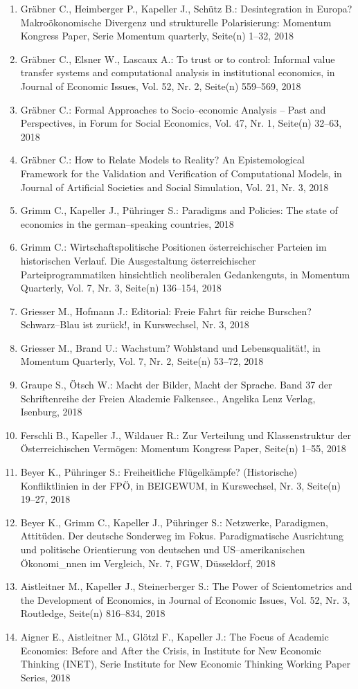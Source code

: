 \begin{enumerate}
	 \item Gräbner C., Heimberger P., Kapeller J., Schütz B.: Desintegration in Europa? Makroökonomische Divergenz und strukturelle Polarisierung: Momentum Kongress Paper, Serie Momentum quarterly, Seite(n) 1--32, 2018
	 \item Gräbner C., Elsner W., Lascaux A.: To trust or to control: Informal value transfer systems and computational analysis in institutional economics, in Journal of Economic Issues, Vol. 52, Nr. 2, Seite(n) 559--569, 2018
	 \item Gräbner C.: Formal Approaches to Socio--economic Analysis -- Past and Perspectives, in Forum for Social Economics, Vol. 47, Nr. 1, Seite(n) 32--63, 2018
	 \item Gräbner C.: How to Relate Models to Reality? An Epistemological Framework for the Validation and Verification of Computational Models, in Journal of Artificial Societies and Social Simulation, Vol. 21, Nr. 3, 2018
	 \item Grimm C., Kapeller J., Pühringer S.: Paradigms and Policies: The state of economics in the german--speaking countries, 2018
	 \item Grimm C.: Wirtschaftspolitische Positionen österreichischer Parteien im historischen Verlauf. Die Ausgestaltung österreichischer Parteiprogrammatiken hinsichtlich neoliberalen Gedankenguts, in Momentum Quarterly, Vol. 7, Nr. 3, Seite(n) 136--154, 2018
	 \item Griesser M., Hofmann J.: Editorial: Freie Fahrt für reiche Burschen? Schwarz--Blau ist zurück!, in Kurswechsel, Nr. 3, 2018
	 \item Griesser M., Brand U.: Wachstum? Wohlstand und Lebensqualität!, in Momentum Quarterly, Vol. 7, Nr. 2, Seite(n) 53--72, 2018
	 \item Graupe S., Ötsch W.: Macht der Bilder, Macht der Sprache. Band 37 der Schriftenreihe der Freien Akademie Falkensee., Angelika Lenz Verlag, Isenburg, 2018
	 \item Ferschli B., Kapeller J., Wildauer R.: Zur Verteilung und Klassenstruktur der Österreichischen Vermögen: Momentum Kongress Paper, Seite(n) 1--55, 2018
	 \item Beyer K., Pühringer S.: Freiheitliche Flügelkämpfe? (Historische) Konfliktlinien in der FPÖ, in BEIGEWUM, in Kurswechsel, Nr. 3, Seite(n) 19--27, 2018
	 \item Beyer K., Grimm C., Kapeller J., Pühringer S.: Netzwerke, Paradigmen, Attitüden. Der deutsche Sonderweg im Fokus. Paradigmatische Ausrichtung und politische Orientierung von deutschen und US--amerikanischen Ökonomi\_nnen im Vergleich, Nr. 7, FGW, Düsseldorf, 2018
	 \item Aistleitner M., Kapeller J., Steinerberger S.: The Power of Scientometrics and the Development of Economics, in Journal of Economic Issues, Vol. 52, Nr. 3, Routledge, Seite(n) 816--834, 2018
	 \item Aigner E., Aistleitner M., Glötzl F., Kapeller J.: The Focus of Academic Economics: Before and After the Crisis, in Institute for New Economic Thinking (INET), Serie Institute for New Economic Thinking  Working Paper Series, 2018
\end{enumerate}
